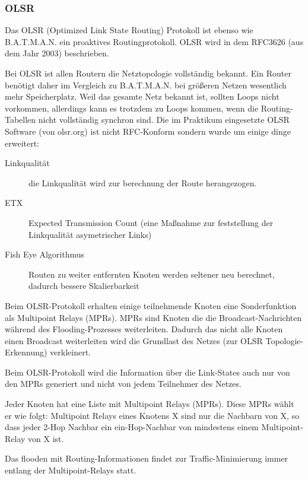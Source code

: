 \documentclass[a4paper,10pt]{article}
\begin{document}

\subsubsection*{OLSR}
Das OLSR (Optimized Link State Routing) Protokoll ist ebenso wie B.A.T.M.A.N. ein proaktives Routingprotokoll.
OLSR wird in dem RFC3626 (aus dem Jahr 2003) beschrieben.

Bei OLSR ist allen Routern die Netztopologie vollständig bekannt. Ein Router benötigt daher im Vergleich zu B.A.T.M.A.N. bei größeren
Netzen wesentlich mehr Speicherplatz.
Weil das gesamte Netz bekannt ist, sollten Loops nicht vorkommen, allerdings kann es trotzdem zu Loops kommen, wenn die Routing-Tabellen nicht 
vollständig synchron sind.
Die im Praktikum eingesetzte OLSR Software (von olsr.org) ist nicht RFC-Konform sondern wurde um einige dinge erweitert:

\begin{description}
\item[Linkqualität] die Linkqualität wird zur berechnung der Route herangezogen.
\item[ETX] Expected Transmission Count (eine Maßnahme zur feststellung der Linkqualität asymetrischer Links)
\item[Fish Eye Algorithmus] Routen zu weiter entfernten Knoten werden seltener neu berechnet, dadurch bessere Skalierbarkeit
\end{description}

Beim OLSR-Protokoll erhalten einige teilnehmende Knoten eine Sonderfunktion als Multipoint Relays (MPRs).
MPRs sind Knoten die die Broadcast-Nachrichten während des Flooding-Prozesses weiterleiten. Dadurch das nicht alle
Knoten einen Broadcast weiterleiten wird die Grundlast des Netzes (zur OLSR Topologie-Erkennung) verkleinert.

Beim OLSR-Protokoll wird die Information über die Link-States auch nur von den MPRs generiert und nicht von jedem
Teilnehmer des Netzes.

Jeder Knoten hat eine Liste mit Multipoint Relays (MPRs). Diese MPRs wählt
er wie folgt: 
Multipoint Relays eines Knotens X sind nur die Nachbarn von X, so dass
jeder 2-Hop Nachbar ein ein-Hop-Nachbar von mindestens einem Multipoint-Relay von X ist.

Das flooden mit Routing-Informationen findet zur Traffic-Minimierung immer entlang der Multipoint-Relays statt.
\end{document}
